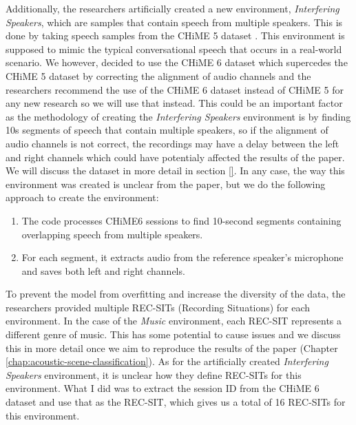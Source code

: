 \documentclass[logo,bsc,singlespacing,parskip,online]{infthesis}
\begin{document}
Additionally, the researchers artificially created a new environment, \textit{Interfering Speakers}, which are samples that contain speech from multiple speakers. 
This is done by taking speech samples from the CHiME 5 dataset \cite{barker18_fifth_2018}. This environment is supposed to mimic the 
typical conversational speech that occurs in a real-world scenario. We however, decided to use the CHiME 6 dataset which 
supercedes the CHiME 5 dataset \cite{barker18_fifth_2018} by correcting the alignment of audio channels and the researchers 
recommend the use of the CHiME 6 dataset instead of CHiME 5 for any new research so we will use that instead. This could 
be an important factor as the methodology of creating the \textit{Interfering Speakers} environment is by finding 10s 
segments of speech that contain multiple speakers, so if the alignment of audio channels is not correct, the recordings 
may have a delay between the left and right channels which could have potentialy affected the results of the paper. We will discuss the dataset in more detail in section \ref{}.
In any case, the way this environment was created is unclear from the paper, but we do the following approach to create the environment:
\begin{enumerate}
   \item The code processes CHiME6 sessions to find 10-second segments containing overlapping speech from multiple speakers.
   \item For each segment, it extracts audio from the reference speaker's microphone and saves both left and right channels.
\end{enumerate}

To prevent the model from overfitting and increase the diversity of the data, the researchers provided multiple REC-SITs (Recording Situations) for each environment.
In the case of the \textit{Music} environment, each REC-SIT represents a different genre of music. This has some potential to cause issues 
and we discuss this in more detail once we aim to reproduce the results of the paper (Chapter \ref{chap:acoustic-scene-classification}).  %
As for the artificially created \textit{Interfering Speakers} environment, it is unclear how they define REC-SITs for this environment. 
What I did was to extract the session ID from the CHiME 6 dataset and use that as the REC-SIT, which 
gives us a total of 16 REC-SITs for this environment.
\end{document}
